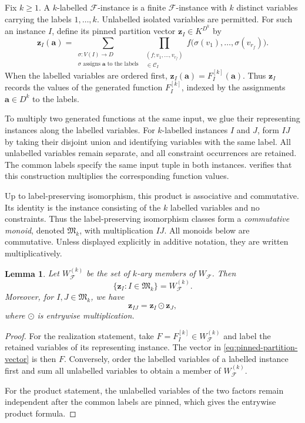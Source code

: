 \documentclass[11pt,letterpaper,onecolumn]{article}
\theoremstyle{plain}
\newtheorem{lemma}[lemma]{Lemma}
\theoremstyle{definition}
\theoremstyle{remark}
\newcommand{\cF}{\mathcal F}
\newcommand{\zvec}[1]{\mathbf z_{#1}}
\newcommand{\InstMonoid}[1]{\mathfrak M_{#1}}
\begin{document}
Fix $k\ge1$.  A $k$-labelled $\cF$-instance is a finite $\cF$-instance
with $k$ distinct variables carrying the labels $1,\ldots,k$.
Unlabelled isolated variables are permitted.  For such an instance $I$,
define its pinned partition vector $\zvec I\in K^{D^k}$ by
\begin{equation}
  \zvec I(\mathbf a)
  =\sum_{\substack{\sigma:V(I)\to D\\
                    \sigma\text{ assigns }\mathbf a\text{ to the labels}}}
       \prod_{\substack{(f;v_1,\ldots,v_{r_f})\\
                         \in\mathcal C_I}}
          f\bigl(\sigma(v_1),\ldots,\sigma(v_{r_f})\bigr).
  \label{eq:pinned-partition-vector}
\end{equation}
When the labelled variables are ordered first,
$\zvec I(\mathbf a)=F_I^{[k]}(\mathbf a)$.  Thus $\zvec I$ records the
values of the generated function $F_I^{[k]}$, indexed by the assignments
$\mathbf a\in D^k$ to the labels.

To multiply two generated functions at the same input, we glue their
representing instances along the labelled variables.  For $k$-labelled
instances $I$ and $J$, form $IJ$ by taking their disjoint union and
identifying variables with the same label.  All unlabelled variables
remain separate, and all constraint occurrences are retained.
The common labels specify the same input tuple in both instances.
 verifies that this construction multiplies
the corresponding function values.

Up to label-preserving isomorphism, this product is associative and
commutative.  Its identity is the instance consisting of the $k$ labelled
variables and no constraints.  Thus the label-preserving isomorphism
classes form a \emph{commutative monoid}, denoted $\InstMonoid{k}$,
with multiplication $IJ$.
All monoids below are commutative.  Unless displayed explicitly in
additive notation, they are written multiplicatively.

\begin{lemma}
\label{lem:pinned-realization}
Let $W_{\cF}^{(k)}$ be the set of $k$-ary members of $W_{\cF}$.  Then
\[
  \{\zvec I:I\in\InstMonoid{k}\}=W_{\cF}^{(k)}.
\]
Moreover, for $I,J\in\InstMonoid{k}$, we have
\[
  \zvec{IJ}=\zvec I\odot\zvec J,
\]
where $\odot$ is entrywise multiplication.
\end{lemma}

\begin{proof}
For the realization statement, take $F=F_I^{[k]}\in W_{\cF}^{(k)}$ and label
the retained variables of its representing instance.  The vector in
\eqref{eq:pinned-partition-vector} is then $F$.  Conversely, order the
labelled variables of a labelled instance first and sum all unlabelled
variables to obtain a member of $W_{\cF}^{(k)}$.

For the product statement, the unlabelled variables of the two
factors remain independent after the common labels are pinned, which gives
the entrywise product formula.
\end{proof}
\end{document}
